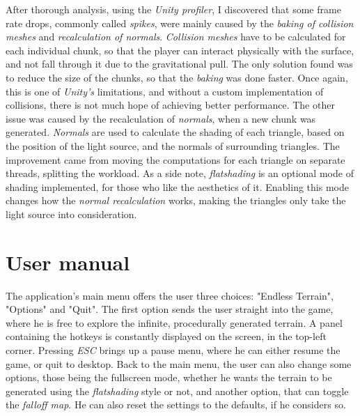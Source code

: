 After thorough analysis, using the \textit{Unity profiler}, I discovered that some frame rate drops, commonly called \textit{spikes}, were mainly caused by the \textit{baking of collision meshes} and \textit{recalculation of normals}. \textit{Collision meshes} have to be calculated for each individual chunk, so that the player can interact physically with the surface, and not fall through it due to the gravitational pull. The only solution found was to reduce the size of the chunks, so that the \textit{baking} was done faster. Once again, this is one of \textit{Unity's} limitations, and without a custom implementation of collisions, there is not much hope of achieving better performance. The other issue was caused by the recalculation of \textit{normals}, when a new chunk was generated. \textit{Normals} are used to calculate the shading of each triangle, based on the position of the light source, and the normals of surrounding triangles. The improvement came from moving the computations for each triangle on separate threads, splitting the workload. As a side note, \textit{flatshading} is an optional mode of shading implemented, for those who like the aesthetics of it. Enabling this mode changes how the \textit{normal recalculation} works, making the triangles only take the light source into consideration.

\section{User manual}

The application's main menu offers the user three choices: "Endless Terrain", "Options" and "Quit". The first option sends the user straight into the game, where he is free to explore the infinite, procedurally generated terrain. A panel containing the hotkeys is constantly displayed on the screen, in the top-left corner. Pressing \textit{ESC} brings up a pause menu, where he can either resume the game, or quit to desktop. Back to the main menu, the user can also change some options, those being the fullscreen mode, whether he wants the terrain to be generated using the \textit{flatshading} style or not, and another option, that can toggle the \textit{falloff map}. He can also reset the settings to the defaults, if he considers so.
